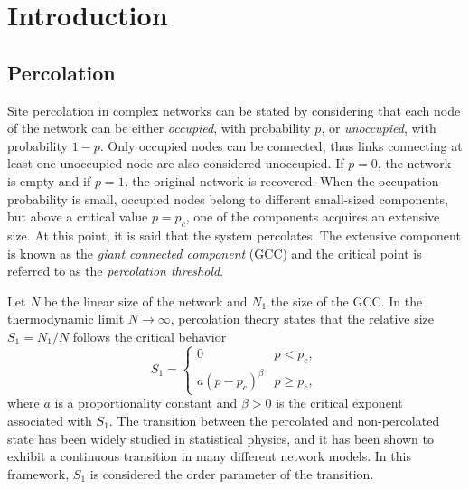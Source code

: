 \documentclass{article}
\begin{document}
\section{Introduction}

\subsection{Percolation}\label{subsec:Percolation}

Site percolation in complex networks can be stated by considering that each node of the network can be either \emph{occupied}, with probability $p$, or \emph{unoccupied}, with probability $1-p$. Only occupied nodes can be connected, thus links connecting at least one unoccupied node are also considered unoccupied. If $p=0$, the network is empty and if $p=1$, the original network is recovered. When the occupation probability is small, occupied nodes belong to different small-sized components, but above a critical value $p=p_c$, one of the components acquires an extensive size. At this point, it is said that the system percolates. The extensive component is known as the \emph{giant connected component} (GCC) and the critical point is referred to as the \emph{percolation threshold}.

Let $N$ be the linear size of the network and $N_1$ the size of the GCC. In the thermodynamic limit $N\rightarrow \infty$, percolation theory states that the relative size $S_1 = N_1/N$ follows the critical behavior
%
\begin{equation}
    S_1=
    \begin{cases}
    0 &  p <  p_c, \\
    a(p-p_c)^\beta &  p \ge p_c,
    \end{cases}
\end{equation}
%
where $a$ is a proportionality constant and $\beta>0$ is the critical exponent associated with $S_1$. The transition between the percolated and non-percolated state has been widely studied in statistical physics, and it has been shown to exhibit a continuous transition in many different network models. In this framework, $S_1$ is considered the order parameter of the transition. 
\end{document}
